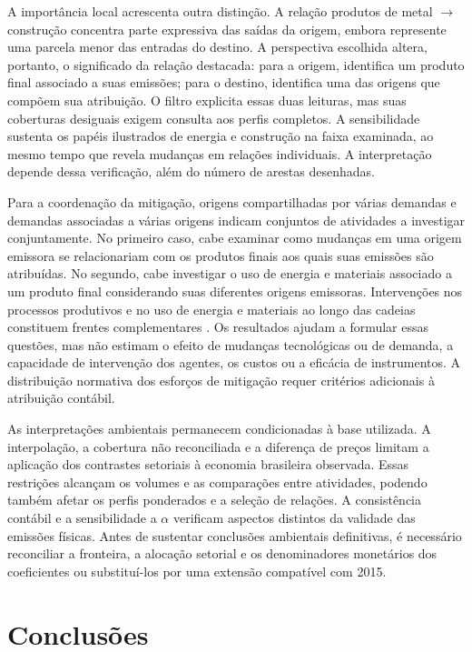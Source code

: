 \documentclass[12pt]{article}
\begin{document}
A importância local acrescenta outra distinção. A relação produtos de metal $\rightarrow$ construção concentra parte expressiva das saídas da origem, embora represente uma parcela menor das entradas do destino. A perspectiva escolhida altera, portanto, o significado da relação destacada: para a origem, identifica um produto final associado a suas emissões; para o destino, identifica uma das origens que compõem sua atribuição. O filtro explicita essas duas leituras, mas suas coberturas desiguais exigem consulta aos perfis completos. A sensibilidade sustenta os papéis ilustrados de energia e construção na faixa examinada, ao mesmo tempo que revela mudanças em relações individuais. A interpretação depende dessa verificação, além do número de arestas desenhadas.

Para a coordenação da mitigação, origens compartilhadas por várias demandas e demandas associadas a várias origens indicam conjuntos de atividades a investigar conjuntamente. No primeiro caso, cabe examinar como mudanças em uma origem emissora se relacionariam com os produtos finais aos quais suas emissões são atribuídas. No segundo, cabe investigar o uso de energia e materiais associado a um produto final considerando suas diferentes origens emissoras. Intervenções nos processos produtivos e no uso de energia e materiais ao longo das cadeias constituem frentes complementares \parencite{rissman2020}. Os resultados ajudam a formular essas questões, mas não estimam o efeito de mudanças tecnológicas ou de demanda, a capacidade de intervenção dos agentes, os custos ou a eficácia de instrumentos. A distribuição normativa dos esforços de mitigação requer critérios adicionais à atribuição contábil.

As interpretações ambientais permanecem condicionadas à base utilizada. A interpolação, a cobertura não reconciliada e a diferença de preços limitam a aplicação dos contrastes setoriais à economia brasileira observada. Essas restrições alcançam os volumes e as comparações entre atividades, podendo também afetar os perfis ponderados e a seleção de relações. A consistência contábil e a sensibilidade a $\alpha$ verificam aspectos distintos da validade das emissões físicas. Antes de sustentar conclusões ambientais definitivas, é necessário reconciliar a fronteira, a alocação setorial e os denominadores monetários dos coeficientes ou substituí-los por uma extensão compatível com 2015.

\section{Conclusões}
\end{document}
